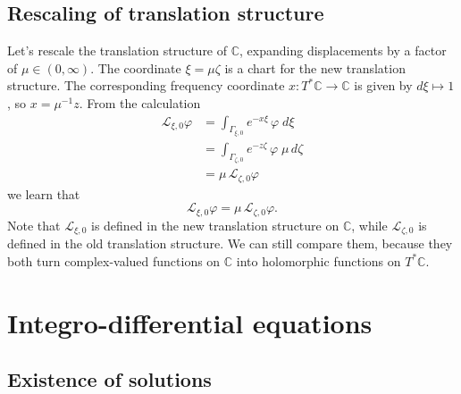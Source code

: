 \documentclass{article}
\theoremstyle{plain}
\newcommand{\maps}{\colon}
\newcommand{\C}{\mathbb{C}}
\newcommand{\laplace}{\mathcal{L}}
\begin{document}
\subsection{Rescaling of translation structure}
Let's rescale the translation structure of $\C$, expanding displacements by a factor of $\mu \in (0, \infty)$. The coordinate $\xi = \mu\zeta$ is a chart for the new translation structure. The corresponding frequency coordinate $x \maps T^*\C \to \C$ is given by $d\xi \mapsto 1$, so $x = \mu^{-1} z$. From the calculation
\begin{align*}
\laplace_{\xi, 0} \varphi & = \int_{\Gamma_{\xi, 0}} e^{-x\xi}\,\varphi\;d\xi \\
& = \int_{\Gamma_{\zeta, 0}} e^{-z \zeta}\,\varphi\;\mu\,d\zeta \\
& = \mu\,\laplace_{\zeta, 0} \varphi
\end{align*}
we learn that
\[ \laplace_{\xi, 0} \varphi = \mu\,\laplace_{\zeta, 0} \varphi. \]
Note that $\laplace_{\xi, 0}$ is defined in the new translation structure on $\C$, while $\laplace_{\zeta, 0}$ is defined in the old translation structure. We can still compare them, because they both turn complex-valued functions on $\C$ into holomorphic functions on $T^*\C$.
\section{Integro-differential equations}
\subsection{Existence of solutions}
\end{document}

